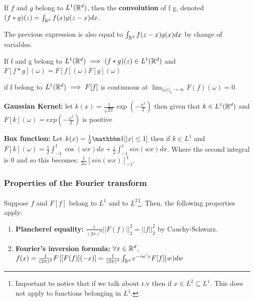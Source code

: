 \documentclass{article}
\begin{document}
\begin{definition}
    If $f$ and $g$ belong to $L^{1}(\mathbb{R}^{d})$, then the \textbf{convolution} of f g, denoted \((f * g)(z)=\int_{\mathbb{R}^{d}}f(x)g(z-x)dx\).  
\end{definition}

\begin{remark}
    The previous expression is also equal to \(\int_{\mathbb{R}^{d}}f(z-x)g(x)dx\) by change of variables. 
\end{remark}

\begin{proposition}
    If f and g belong to \(L^{1} (\mathbb{R}^{d})\implies (f * g)(z) \in L^{1} (\mathbb{R}^{d})\) and \(F[f * g](\omega)=F[f](\omega) F[g](\omega)\)
\end{proposition}

\begin{proposition}
    if f belong to \(L^{1} (\mathbb{R}^{d})\implies F[f]\) is continuous at \(\lim_{||\omega||_{2}\rightarrow \infty} F(f)(\omega)=0\)
\end{proposition}


\begin{example}
    \textbf{Gaussian Kernel: }let \(k(x)=\frac{1}{\sqrt{2\pi}}\exp \left(-\frac{x^{2}}{2}\right)\) then given that \(k \in L^{1}(\mathbb{R}^{d})\) and \(F[k](\omega)=exp \left(-\frac{\omega^{2}}{2}\right)\) is positive
\end{example}
 

\begin{example}
    \textbf{Box function: }Let \(k(x)=\frac{1}{2} \indf[|x|\leq1]\) then if \(k \in L^{1}\) and \(F[k](\omega)=\frac{1}{2}\int_{-1}^{1} \cos(wx) dx + \frac{i}{2}\int_{-1}^{1}sin(wx) dx\). Where the second integral is 0 and so this becomes: \(\frac{1}{2\omega}\left[sin(wx)\right]^{1}_{-1}\). 
\end{example}

\subsubsection{Properties of the Fourier transform}
Suppose \(f\) and \(F[f]\) belong to \(L^{1}\) and to \(L^{2}\)\footnote{Important to notice that if we talk about r.v then if \(x \in L^{2}\subseteq L^{1}\). This does not apply to functions belonging in \(L^{1}\).}. Then, the following properties apply: \begin{enumerate}
    \item \textbf{Plancherel equality: }\(\frac{1}{(2\pi)^{d}}||F(f)||^{2}_{2}=||f||^{2}_{2}\) by Cauchy-Schwarz. 
    \item \textbf{Fourier's inversion formula: }\(\forall x \in \mathbb{R}^{d}\), \(f(x)=\frac{1}{(2\pi)^{d}} F\left[[F(f)](-x)\right]=\frac{1}{(2\pi)^{d}}\int_{\mathbb{R}^{d}}e^{-iw'x}F[f](w)dw\)
\end{enumerate}
\end{document}
